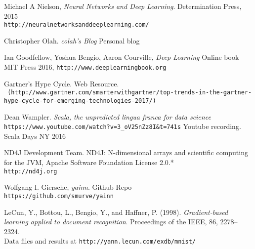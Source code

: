 \documentclass[]{report}
\begin{document}
\begin{thebibliography}{9}
	
	
	Michael A Nielson, \textit{Neural Networks and Deep Learning}.
	Determination Press, 2015
	\\\texttt{http://neuralnetworksanddeeplearning.com/}
	
	Christopher Olah. \textit{colah's Blog}
	Personal blog
	
	Ian Goodfellow, Yoshua Bengio, Aaron Courville, \textit{	Deep Learning }
	Online book MIT Press 2016,
	\texttt{http://www.deeplearningbook.org}

	Gartner's Hype Cycle. Web Resource.
	\\\texttt{ (http://www.gartner.com/smarterwithgartner/top-trends-in-the-gartner-hype-cycle-for-emerging-technologies-2017/)}
	
	Dean Wampler. \textit{Scala, the unpredicted lingua franca for data science}
	 \\\texttt{https://www.youtube.com/watch?v=3\_oV25nZz8I\&t=741s}
	Youtube recording. Scala Days NY 2016
	
	ND4J Development Team. ND4J: N-dimensional arrays and scientific computing for the JVM, Apache Software Foundation License 2.0.* 
	\\\texttt{http://nd4j.org}
	
	Wolfgang I. Giersche, \textit{yainn}. Github Repo
	\\\texttt{https://github.com/smurve/yainn}
	
	LeCun, Y., Bottou, L., Bengio, Y., and Haffner, P. (1998). \textit{Gradient-based learning applied to document recognition}. Proceedings of the IEEE, 86, 2278–2324.	
	\\Data files and results at \texttt{http://yann.lecun.com/exdb/mnist/}
\end{thebibliography}
\end{document}
